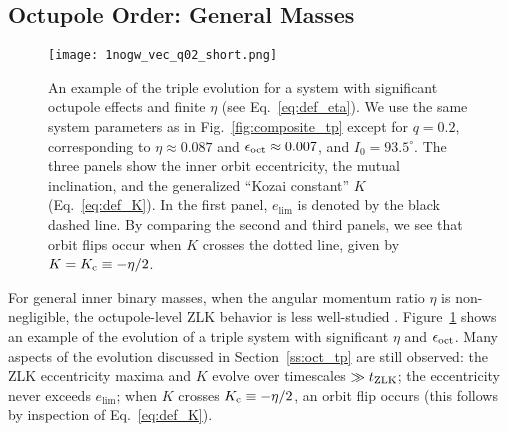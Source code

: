 \documentclass[
        fleqn,
        usenatbib,
    ]{mnras}
\begin{document}
\subsection{Octupole Order: General Masses}\label{ss:oct_gen}

\begin{figure}
    \centering
    \texttt{[image: 1nogw\_vec\_q02\_short.png]}
    \caption{An example of the triple evolution for a system with significant
    octupole effects and finite $\eta$ (see Eq.~\ref{eq:def_eta}). We use the
    same system parameters as in Fig.~\ref{fig:composite_tp} except for $q =
    0.2$, corresponding to $\eta \approx 0.087$ and $\epsilon_{\rm oct} \approx
    0.007$, and $I_0 = 93.5^\circ$. The three panels show the inner orbit
    eccentricity, the mutual inclination, and the generalized ``Kozai constant''
    $K$ (Eq.~\ref{eq:def_K}). In the first panel, $e_{\lim}$ is denoted by the
    black dashed line. By comparing the second and third panels, we see that
    orbit flips occur when $K$ crosses the dotted line, given by $K = K_{\rm c}
    \equiv -\eta / 2$. }\label{fig:nogw_fiducial}
\end{figure}

For general inner binary masses, when the angular momentum ratio $\eta$ is
non-negligible, the octupole-level ZLK behavior is less well-studied
\citep[see][]{LML15}. Figure~\ref{fig:nogw_fiducial} shows an example of the
evolution of a triple system with significant $\eta$ and $\epsilon_{\rm oct}$.
Many aspects of the evolution discussed in Section~\ref{ss:oct_tp} are still
observed: the ZLK eccentricity maxima and $K$ evolve over timescales $\gg t_{\rm
ZLK}$; the eccentricity never exceeds $e_{\lim}$; when $K$ crosses $K_{\rm c}
\equiv -\eta / 2$, an orbit flip occurs (this follows by inspection of
Eq.~\ref{eq:def_K}).
\end{document}
